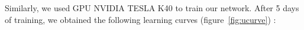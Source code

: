 %

\noindent Similarly, we used GPU NVIDIA TESLA K40 to train our network. After 5 days of training, we obtained the following learning curves (figure~\ref{fig:ucurve}) :

